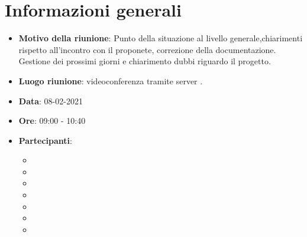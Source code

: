 \section{Informazioni generali}
\begin{itemize}
\item \textbf{Motivo della riunione}: Punto della situazione al livello generale,chiarimenti rispetto all'incontro con il proponete, correzione della documentazione. Gestione dei prossimi giorni e chiarimento dubbi riguardo il progetto.
\item \textbf{Luogo riunione}: videoconferenza tramite server .
\item \textbf{Data}: 08-02-2021
\item \textbf{Ore}: 09:00 - 10:40
\item \textbf{Partecipanti}:
	\begin{itemize}
	\item \BM{}
	\item \SG{}
	\item \SP{}
	\item \SH{}
	\item \PA{}
	\item \ZM{}
	\item \RA{}
	\end{itemize}
\end{itemize}

\newpage
